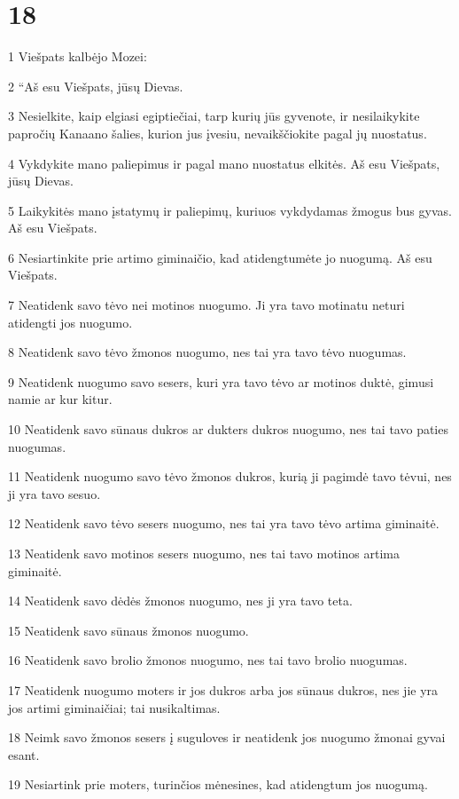 \chapter{18}

\par 1 Viešpats kalbėjo Mozei: 
\par 2 “Aš esu Viešpats, jūsų Dievas. 
\par 3 Nesielkite, kaip elgiasi egiptiečiai, tarp kurių jūs gyvenote, ir nesilaikykite papročių Kanaano šalies, kurion jus įvesiu, nevaikščiokite pagal jų nuostatus. 
\par 4 Vykdykite mano paliepimus ir pagal mano nuostatus elkitės. Aš esu Viešpats, jūsų Dievas. 
\par 5 Laikykitės mano įstatymų ir paliepimų, kuriuos vykdydamas žmogus bus gyvas. Aš esu Viešpats. 
\par 6 Nesiartinkite prie artimo giminaičio, kad atidengtumėte jo nuogumą. Aš esu Viešpats. 
\par 7 Neatidenk savo tėvo nei motinos nuogumo. Ji yra tavo motina­tu neturi atidengti jos nuogumo. 
\par 8 Neatidenk savo tėvo žmonos nuogumo, nes tai yra tavo tėvo nuogumas. 
\par 9 Neatidenk nuogumo savo sesers, kuri yra tavo tėvo ar motinos duktė, gimusi namie ar kur kitur. 
\par 10 Neatidenk savo sūnaus dukros ar dukters dukros nuogumo, nes tai tavo paties nuogumas. 
\par 11 Neatidenk nuogumo savo tėvo žmonos dukros, kurią ji pagimdė tavo tėvui, nes ji yra tavo sesuo. 
\par 12 Neatidenk savo tėvo sesers nuogumo, nes tai yra tavo tėvo artima giminaitė. 
\par 13 Neatidenk savo motinos sesers nuogumo, nes tai tavo motinos artima giminaitė. 
\par 14 Neatidenk savo dėdės žmonos nuogumo, nes ji yra tavo teta. 
\par 15 Neatidenk savo sūnaus žmonos nuogumo. 
\par 16 Neatidenk savo brolio žmonos nuogumo, nes tai tavo brolio nuogumas. 
\par 17 Neatidenk nuogumo moters ir jos dukros arba jos sūnaus dukros, nes jie yra jos artimi giminaičiai; tai nusikaltimas. 
\par 18 Neimk savo žmonos sesers į suguloves ir neatidenk jos nuogumo žmonai gyvai esant. 
\par 19 Nesiartink prie moters, turinčios mėnesines, kad atidengtum jos nuogumą. 
